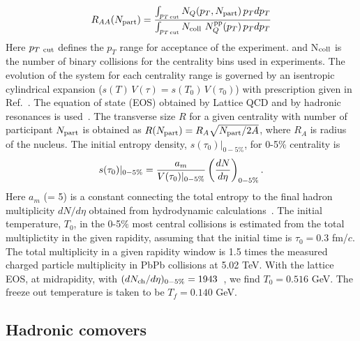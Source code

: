\documentclass[12pt,a4paper,final]{iopart} %
\newcommand{\npart}{N_{\rm part}}
\begin{document}
\begin{equation}
  R_{AA}(N_{\rm part}) = \frac{\int_{p_{T\,\rm cut}} N_{Q}(p_T, \npart) \, p_T dp_T}
                  {\int_{p_{T\,\rm cut}} N_{\rm coll} \,\, N^{\rm pp}_{Q}(p_T) \, p_T dp_T} 
\label{raa2}
\end{equation}
Here $p_{T~{\rm cut}}$ defines the $p_T$ range for acceptance of the experiment.
and N$_{\rm coll}$ is the number of binary collisions for the centrality bins used in
experiments.
 The evolution of the system for each centrality range is governed by an isentropic
cylindrical expansion ($s(T)\,V(\tau)= s(T_0)\,V(\tau_0)$) with prescription given
in Ref.~\cite{Kumar:2014kfa}.
The equation of state (EOS) obtained by Lattice QCD and by hadronic resonances is
used~\cite{Huovinen:2009yb}. The transverse size $R$ for a given centrality
with number of participant $\npart$ is obtained as $R(\npart) = R_{A} \sqrt{\npart/2A}$,
where $R_{A}$ is radius of the nucleus.
The initial entropy density, $s(\tau_0)|_{0-5\%}$, for 0-5\% centrality is 
\begin{eqnarray}
s(\tau_0)|_{0-5\%}  = {a_{m} \over V(\tau_0)|_{0-5\%}}   \left(\frac{dN}{d\eta}\right)_{0-5\%} . 
\label{TempVsMult}
\end{eqnarray}  
Here $a_m$ (= 5) is a constant connecting the total entropy to the final hadron 
multiplicity $dN/d\eta$ obtained from hydrodynamic calculations~\cite{Shuryak:1992wc}.
The initial temperature, $T_0$, in the 0-5$\%$ most central collisions is estimated 
from the total multiplictity in the given rapidity, assuming that the initial time is
$\tau_0 = 0.3$ fm/$c$. The total multiplicity in a given rapidity window is
1.5 times the measured charged particle multiplicity in PbPb collisions at 5.02 TeV.
With the lattice EOS, at midrapidity, with $(dN_{\rm ch}/d\eta)_{0-5\%} = 1943$~\cite{Adam:2015ptt}, 
we find $T_0 = 0.516$ GeV. The freeze out temperature is taken to be $T_f=0.140$ GeV.

\subsection{Hadronic comovers}
\end{document}
